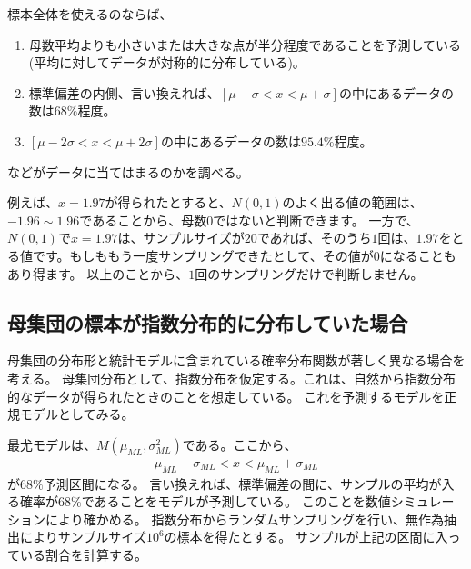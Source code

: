 標本全体を使えるのならば、
\begin{enumerate}
 \item 母数平均よりも小さいまたは大きな点が半分程度であることを予測している(平均に対してデータが対称的に分布している)。
 \item 標準偏差の内側、言い換えれば、$[\mu-\sigma<x<\mu+\sigma]$の中にあるデータの数は$68\%$程度。
 \item $[\mu-2\sigma < x < \mu+2\sigma]$の中にあるデータの数は$95.4\%$程度。
\end{enumerate}
などがデータに当てはまるのかを調べる。




例えば、$x=1.97$が得られたとすると、$N(0,1)$のよく出る値の範囲は、$-1.96\sim1.96$であることから、母数$0$ではないと判断できます。
一方で、$N(0,1)$で$x=1.97$は、サンプルサイズが$20$であれば、そのうち$1$回は、$1.97$をとる値です。もしももう一度サンプリングできたとして、その値が$0$になることもあり得ます。
以上のことから、$1$回のサンプリングだけで判断しません。
\fi

\subsection{母集団の標本が指数分布的に分布していた場合}
母集団の分布形と統計モデルに含まれている確率分布関数が著しく異なる場合を考える。
母集団分布として、指数分布を仮定する。これは、自然から指数分布的なデータが得られたときのことを想定している。
これを予測するモデルを正規モデルとしてみる。

最尤モデルは、$M(\mu_{ML},\sigma^2_{ML})$である。ここから、
\begin{eqnarray*}
    \mu_{ML}-\sigma_{ML} < x < \mu_{ML}+\sigma_{ML}
\end{eqnarray*}
が$68\%$予測区間になる。
言い換えれば、標準偏差の間に、サンプルの平均が入る確率が$68\%$であることをモデルが予測している。
このことを数値シミュレーションにより確かめる。
指数分布からランダムサンプリングを行い、無作為抽出によりサンプルサイズ$10^6$の標本を得たとする。
サンプルが上記の区間に入っている割合を計算する。

